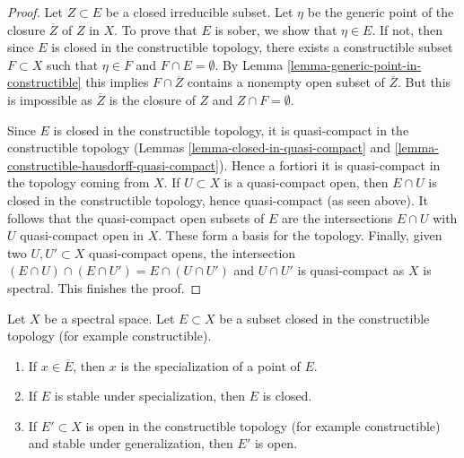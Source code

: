 \begin{proof}
Let $Z \subset E$ be a closed irreducible subset. Let $\eta$ be the generic
point of the closure $\overline{Z}$ of $Z$ in $X$. To prove that $E$
is sober, we show that $\eta \in E$. If not, then since $E$ is closed
in the constructible topology, there exists a constructible subset
$F \subset X$ such that $\eta \in F$ and $F \cap E = \emptyset$.
By Lemma \ref{lemma-generic-point-in-constructible} this implies
$F \cap \overline{Z}$ contains a nonempty open subset of $\overline{Z}$.
But this is impossible as $\overline{Z}$ is the closure of $Z$ and
$Z \cap F = \emptyset$.

\medskip\noindent
Since $E$ is closed in the constructible topology, it is quasi-compact
in the constructible topology
(Lemmas \ref{lemma-closed-in-quasi-compact} and
\ref{lemma-constructible-hausdorff-quasi-compact}). Hence a fortiori it is
quasi-compact in the topology coming from $X$. If $U \subset X$
is a quasi-compact open, then $E \cap U$ is closed in the constructible
topology, hence quasi-compact (as seen above). It follows that the
quasi-compact open subsets of $E$ are the intersections $E \cap U$
with $U$ quasi-compact open in $X$. These form a basis for the topology.
Finally, given two $U, U' \subset X$ quasi-compact opens, the intersection
$(E \cap U) \cap (E \cap U') = E \cap (U \cap U')$ and $U \cap U'$
is quasi-compact as $X$ is spectral. This finishes the proof.
\end{proof}

\begin{lemma}
\label{lemma-constructible-stable-specialization-closed}
Let $X$ be a spectral space. Let $E \subset X$ be a subset closed
in the constructible topology (for example constructible).
\begin{enumerate}
\item If $x \in \overline{E}$, then $x$ is the specialization of a point of
$E$.
\item If $E$ is stable under specialization, then $E$ is closed.
\item If $E' \subset X$ is open in the constructible topology
(for example constructible) and stable under generalization, then $E'$ is open.
\end{enumerate}
\end{lemma}

